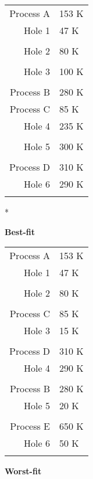 \documentclass[letterpaper,11pt]{article}
\begin{document}
\begin{enumerate}
\begin{minipage}[t]{0.22\textwidth}
  \begin{tabular}{| r  l |}
    \rowcolor{gray}
     & \\ \hline
    Process A & 153 K \\ \hline
    Hole 1 & 47 K \\ \hline
    \rowcolor{gray}
     & \\ \hline
    Hole 2 & 80 K \\ \hline
    \rowcolor{gray}
     & \\ \hline
    Hole 3 & 100 K \\ \hline
    \rowcolor{gray}
     & \\ \hline
    Process B & 280 K \\ \hline
    Process C & 85 K \\ \hline
    Hole 4 & 235 K \\ \hline
    \rowcolor{gray}
     & \\ \hline
    Hole 5 & 300 K \\ \hline
    \rowcolor{gray}
     & \\ \hline
    Process D & 310 K \\ \hline
    Hole 6 & 290 K \\ \hline
    \rowcolor{gray}
     & \\ \hline
  \end{tabular}   

* 
\end{minipage} 
\begin{minipage}[t]{0.22\textwidth} 
\textbf{Best-fit}

  \begin{tabular}{| r  l |}
    \rowcolor{gray}
     & \\ \hline
    Process A & 153 K \\ \hline
    Hole 1 & 47 K \\ \hline
    \rowcolor{gray}
     & \\ \hline
    Hole 2 & 80 K \\ \hline
    \rowcolor{gray}
     & \\ \hline
    Process C & 85 K \\ \hline
    Hole 3 & 15 K \\ \hline
    \rowcolor{gray}
     & \\ \hline
    Process D & 310 K \\ \hline
    Hole 4 & 290 K \\ \hline
    \rowcolor{gray}
     & \\ \hline
    Process B & 280 K \\ \hline
    Hole 5 & 20 K \\ \hline
    \rowcolor{gray}
     & \\ \hline
    Process E & 650 K \\ \hline
    Hole 6 & 50 K \\ \hline
    \rowcolor{gray}
     & \\ \hline
  \end{tabular}
\end{minipage}
\begin{minipage}[t]{0.22\textwidth} 
\textbf{Worst-fit}


\end{minipage}
\end{enumerate}
\end{document}
